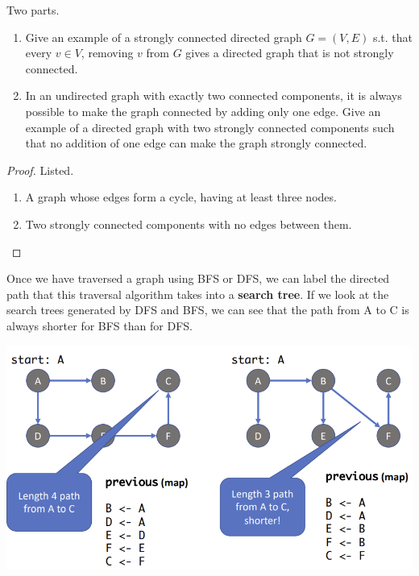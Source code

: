   \begin{exercise}
    Two parts. 
    \begin{enumerate}
      \item Give an example of a strongly connected directed graph $G = (V, E)$ s.t. that every $v \in V$, removing $v$ from $G$ gives a directed graph that is not strongly connected. 
      \item In an undirected graph with exactly two connected components, it is always possible to make the graph connected by adding only one edge. Give an example of a directed graph with two strongly connected components such that no addition of one edge can make the graph strongly connected.
    \end{enumerate}
  \end{exercise}
  \begin{proof}
    Listed. 
    \begin{enumerate}
      \item A graph whose edges form a cycle, having at least three nodes.
      \item Two strongly connected components with no edges between them.
    \end{enumerate}
  \end{proof} 

  \begin{definition}
    Once we have traversed a graph using BFS or DFS, we can label the directed path that this traversal algorithm takes into a \textbf{search tree}. If we look at the search trees generated by DFS and BFS, we can see that the path from A to C is always shorter for BFS than for DFS. 
    \begin{center}
      \includegraphics[scale=0.4]{img/search_trees.png}
    \end{center}
  \end{definition}

